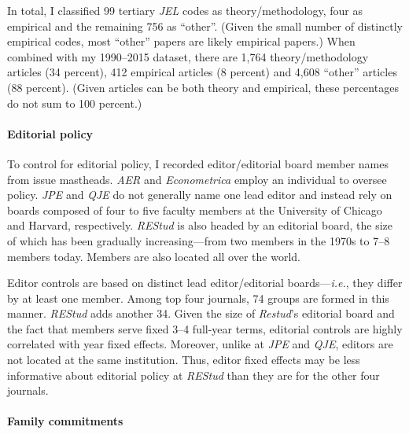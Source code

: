 \begin{appendices}
\begin{refsection}
In total, I classified 99 tertiary \emph{JEL} codes as theory\slash methodology, four as empirical and the remaining 756 as ``other''. (Given the small number of distinctly empirical codes, most ``other'' papers are likely empirical papers.) When combined with my 1990--2015 dataset, there are 1,764 theory\slash methodology articles (34 percent), 412 empirical articles (8 percent) and 4,608 ``other'' articles (88 percent). (Given articles can be both theory and empirical, these percentages do not sum to 100 percent.)



\paragraph{Editorial policy}
\label{appendixcontrolseditorial}

To control for editorial policy, I recorded editor\slash editorial board member names from issue mastheads. \emph{AER} and \emph{Econometrica} employ an individual to oversee policy. \emph{JPE} and \emph{QJE} do not generally name one lead editor and instead rely on boards composed of four to five faculty members at the University of Chicago and Harvard, respectively. \emph{REStud} is also headed by an editorial board, the size of which has been gradually increasing---from two members in the 1970s to 7--8 members today. Members are also located all over the world.

Editor controls are based on distinct lead editor\slash editorial boards---\emph{i.e.}, they differ by at least one member. Among top four journals, 74 groups are formed in this manner. \emph{REStud} adds another 34. Given the size of \emph{Restud}'s editorial board and the fact that members serve fixed 3--4 full-year terms, editorial controls are highly correlated with year fixed effects. Moreover, unlike at \emph{JPE} and \emph{QJE}, editors are not located at the same institution. Thus, editor fixed effects may be less informative about editorial policy at \emph{REStud} than they are for the other four journals.

\paragraph{Family commitments}
\label{appendixcontrolsfamily}


\end{refsection}
\end{appendices}
